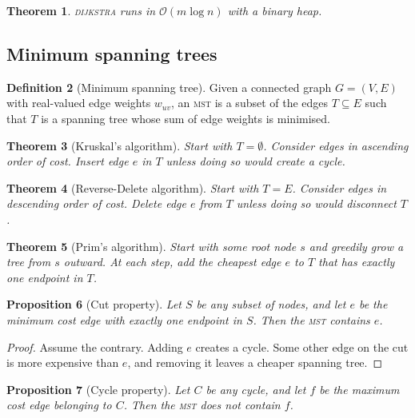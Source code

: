 \documentclass[10pt, oneside, reqno]{amsart}
\theoremstyle{plain}%
\newtheorem{thm}{Theorem}[section]
\newtheorem{prop}[thm]{Proposition}
\theoremstyle{definition}
\newtheorem{defn}[thm]{Definition}
\theoremstyle{remark}
\newcommand{\bigo}[1]{\mathcal{O}(#1)}
\begin{document}
\begin{thm}
	\textsc{dijkstra} runs in $\bigo{m \log n}$ with a binary heap.
\end{thm}

\subsection{Minimum spanning trees} %
\label{sub:minimum_spanning_trees}

\begin{defn}[Minimum spanning tree]
	Given a connected graph $G = (V,E)$ with real-valued edge weights $w_{uv}$, an \textsc{mst} is a subset of the edges $T \subseteq E$ such that $T$ is a spanning tree whose sum of edge weights is minimised.
\end{defn}

\begin{thm}[Kruskal's algorithm]
	Start with $T = \emptyset$.  Consider edges in ascending order of cost.  Insert edge $e$ in $T$ unless doing so would create a cycle.
\end{thm}

\begin{thm}[Reverse-Delete algorithm]
	Start with $T = E$.  Consider edges in descending order of cost.  Delete edge $e$ from $T$ unless doing so would disconnect $T$.
\end{thm}

\begin{thm}[Prim's algorithm]
	Start with some root node $s$ and greedily grow a tree from $s$ outward.  At each step, add the cheapest edge $e$ to $T$ that has exactly one endpoint in $T$.
\end{thm}

\begin{prop}[Cut property]
	Let $S$ be any subset of nodes, and let $e$ be the minimum cost edge with exactly one endpoint in $S$.  Then the \textsc{mst} contains $e$.
\end{prop}

\begin{proof} Assume the contrary. Adding $e$ creates a cycle. Some other edge on the cut is more expensive than $e$, and removing it leaves a cheaper spanning tree.
\end{proof}

\begin{prop}[Cycle property]
	Let $C$ be any cycle, and let $f$ be the maximum cost edge belonging to $C$.  Then the \textsc{mst} does not contain $f$.
\end{prop}
\end{document}
